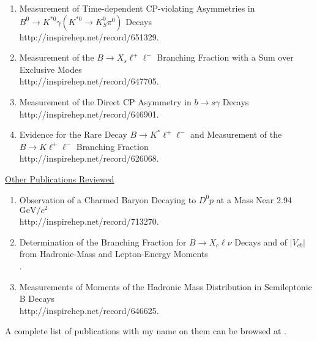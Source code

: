 \documentclass [12pt]{report}
\begin{document}
\begin{enumerate}
\item Measurement of Time-dependent CP-violating Asymmetries
in $B^{0}\rightarrow K^{*0}\gamma (K^{*0}\rightarrow K_{S}^{0} \pi^0)$ Decays\\
{http://inspirehep.net/record/651329}.

\item Measurement of the $B\rightarrow X_{s}\ell^+\ell^-$ Branching Fraction with a Sum over Exclusive Modes\\
{http://inspirehep.net/record/647705}.

\item Measurement of the Direct CP Asymmetry in 
$b \rightarrow s \gamma$ Decays\\
{http://inspirehep.net/record/646901}.

\item Evidence for the Rare Decay $B\rightarrow K^{*} \ell^+\ell^-$ and Measurement of the $B\rightarrow K\ell^+\ell^-$ Branching Fraction\\
{http://inspirehep.net/record/626068}.

\end{enumerate}

\noindent\underline{Other Publications Reviewed}
\begin{enumerate}

\item Observation of a Charmed Baryon Decaying to $D^0 p$ at a Mass Near 2.94 $\textrm{GeV}/c^{\textrm{2}}$\\
{http://inspirehep.net/record/713270}.

\item Determination of the Branching Fraction for $B\rightarrow X_{c}\ell\nu$ Decays and of $|V_{cb}|$ from Hadronic-Mass and Lepton-Energy Moments\\
.

\item Measurements of Moments of the Hadronic Mass Distribution in Semileptonic B Decays\\
{http://inspirehep.net/record/646625}.

\end{enumerate}

A complete list of publications with my name on them can be browsed at
.
\end{document}
